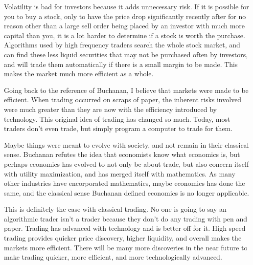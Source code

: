 \documentclass[11pt,]{article}
\begin{document}
Volatility is bad for investors because it adds unnecessary risk. If it
is possible for you to buy a stock, only to have the price drop
significantly recently after for no reason other than a large sell order
being placed by an investor with much more capital than you, it is a lot
harder to determine if a stock is worth the purchase. Algorithms used by
high frequency traders search the whole stock market, and can find these
less liquid securities that may not be purchased often by investors, and
will trade them automatically if there is a small margin to be made.
This makes the market much more efficient as a whole.

Going back to the reference of Buchanan, I believe that markets were
made to be efficient. When trading occurred on scraps of paper, the
inherent risks involved were much greater than they are now with the
efficiency introduced by technology. This original idea of trading has
changed so much. Today, most traders don't even trade, but simply
program a computer to trade for them.

Maybe things were meant to evolve with society, and not remain in their
classical sense. Buchanan refutes the idea that economists know what
economics is, but perhaps economics has evolved to not only be about
trade, but also concern itself with utility maximization, and has merged
itself with mathematics. As many other industries have encorporated
mathematics, maybe economics has done the same, and the classical sense
Buchanan defined economics is no longer applicable.

This is definitely the case with classical trading. No one is going to
say an algorithmic trader isn't a trader because they don't do any
trading with pen and paper. Trading has advanced with technology and is
better off for it. High speed trading provides quicker price discovery,
higher liquidity, and overall makes the markets more efficient. There
will be many more discoveries in the near future to make trading
quicker, more efficient, and more technologically advanced.

\newpage
\singlespacing 

\end{document}
